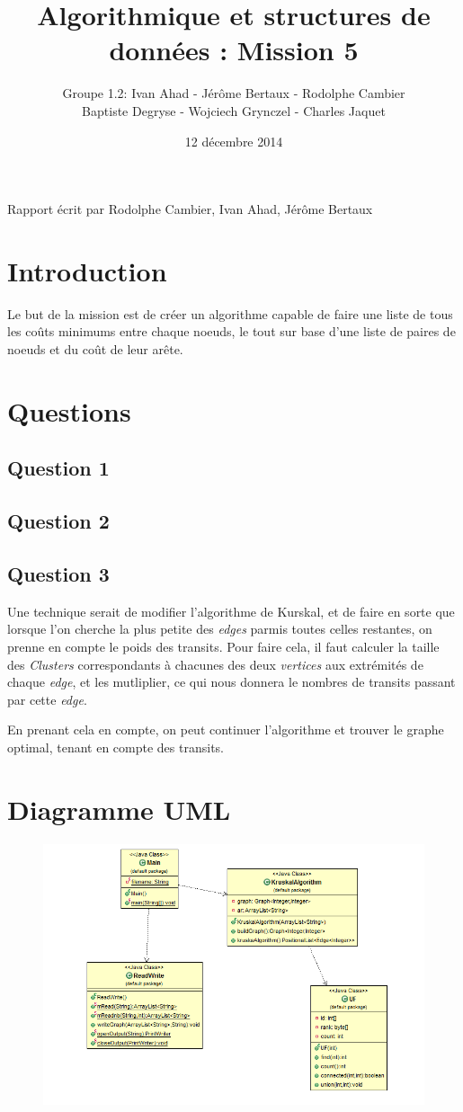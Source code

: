 \documentclass[a4paper]{article}
\title{Algorithmique et structures de données : Mission 5}
\date{12 décembre 2014}
\author{Groupe 1.2: Ivan Ahad - Jérôme Bertaux - Rodolphe Cambier \\ 
	Baptiste Degryse - Wojciech Grynczel - Charles Jaquet}
\begin{document}
\maketitle


Rapport écrit par Rodolphe Cambier, Ivan Ahad, Jérôme Bertaux
\section*{Introduction}
Le but de la mission est de créer un algorithme capable de faire une liste de tous les coûts minimums entre chaque noeuds, le tout sur base d'une liste de paires de noeuds et du coût de leur arête. 
\section*{Questions}

\subsection*{Question 1}

\subsection*{Question 2}

\subsection*{Question 3}

Une technique serait de modifier l'algorithme de Kurskal, et de faire en sorte que lorsque l'on cherche la plus petite des \textit{edges} parmis toutes celles restantes, on prenne en compte le poids des transits. Pour faire cela, il faut calculer la taille des \textit{Clusters} correspondants à chacunes des deux \textit{vertices} aux extrémités de chaque \textit{edge}, et les mutliplier, ce qui nous donnera le nombres de transits passant par cette \textit{edge}.

En prenant cela en compte, on peut continuer l'algorithme et trouver le graphe optimal, tenant en compte des transits.



\section*{Diagramme UML}
\begin{figure}[b]
   \includegraphics[scale=0.4]{UML.png}
\end{figure}
\end{document}
